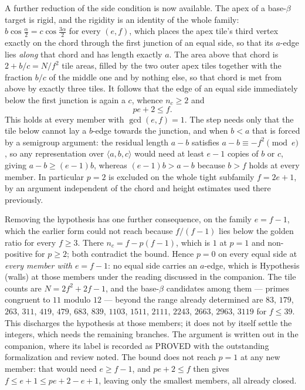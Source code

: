 \documentclass[11pt,reqno]{amsart}
\theoremstyle{plain}
\theoremstyle{definition}
\begin{document}
A further reduction of the side condition is now available. The apex of a base-$\beta$ target is
rigid, and the rigidity is an identity of the whole family: $b\cos\frac{\alpha}{2}=c\cos\frac{3\alpha}{2}$
for every $(e,f)$, which places the apex tile's third vertex exactly on the chord through the first
junction of an equal side, so that its $a$-edge lies \emph{along} that chord and has length exactly
$a$. The area above that chord is $2+b/c=N/f^{2}$ tile areas, filled by the two outer apex tiles
together with the fraction $b/c$ of the middle one and by nothing else, so that chord is met from
above by exactly three tiles. It follows that the edge of an equal side immediately below the first junction is again a $c$, whence
$n_c\ge2$ and
\[
pe+2\le f .
\]
This holds at every member with $\gcd(e,f)=1$. The step needs only that the tile below cannot lay a
$b$-edge towards the junction, and when $b<a$ that is forced by a semigroup argument: the residual
length $a-b$ satisfies $a-b\equiv-f^{2}\pmod e$, so any representation over $\langle a,b,c\rangle$
would need at least $e-1$ copies of $b$ or $c$, giving $a-b\ge(e-1)b$, whereas $(e-1)b>a-b$ because
$b>f$ holds at every member.
In particular $p=2$ is excluded on the whole tight subfamily $f=2e+1$, by an argument independent of
the chord and height estimates used there previously.

Removing the hypothesis has one further consequence, on the family $e=f-1$, which the earlier form
could not reach because $f/(f-1)$ lies below the golden ratio for every $f\ge3$. There
$n_c=f-p(f-1)$, which is $1$ at $p=1$ and non-positive for $p\ge2$; both contradict the bound. Hence
$p=0$ on every equal side at \emph{every member with $e=f-1$}: no equal side carries an $a$-edge, which is
Hypothesis (walls) at those members under the reading discussed in the companion. The tile counts are $N=2f^{2}+2f-1$, and the base-$\beta$ candidates among them --- primes
congruent to $11$ modulo $12$ --- beyond the range already determined are
$83$, $179$, $263$, $311$, $419$, $479$, $683$, $839$, $1103$, $1511$, $2111$, $2243$, $2663$, $2963$,
$3119$ for $f\le39$. This discharges the hypothesis at those members; it does not by itself settle the
integers, which needs the remaining branches. The argument is written out in the companion, where its
label is recorded as PROVED with the outstanding formalization and review noted. The bound does not reach $p=1$ at any new
member: that would need $e\ge f-1$, and $pe+2\le f$ then gives $f\le e+1\le pe+2-e+1$, leaving only
the smallest members, all already closed.
\end{document}
